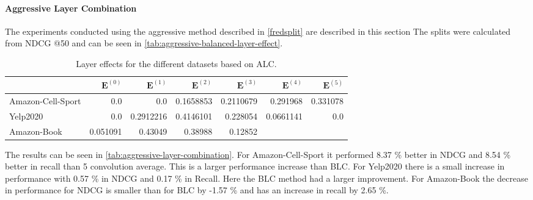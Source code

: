 \paragraph{Aggressive Layer Combination}
The experiments conducted using the aggressive method described in \autoref{fredsplit} are described in this section
The splits were calculated from NDCG @50 and can be seen in \autoref{tab:aggressive-balanced-layer-effect}.
\begin{table*}[]
    \centering
    \begin{tabular}{|l|r|r|r|r|r|r|}
        \hline
                          & $\mathbf{E}^{(0)}$ & $\mathbf{E}^{(1)}$ & $\mathbf{E}^{(2)}$ & $\mathbf{E}^{(3)}$ & $\mathbf{E}^{(4)}$ & $\mathbf{E}^{(5)}$ \\ \hline
        Amazon-Cell-Sport & 0.0                & 0.0                & 0.1658853          & 0.2110679          & 0.291968           & 0.331078           \\ \hline
        Yelp2020          & 0.0                & 0.2912216          & 0.4146101          & 0.228054           & 0.0661141          & 0.0                \\ \hline
        Amazon-Book       & 0.051091           & 0.43049            & 0.38988            & 0.12852            &                    &                    \\ \hline
    \end{tabular}
    \caption{Layer effects for the different datasets based on ALC.}
    \label{tab:aggressive-balanced-layer-effect}
\end{table*}
The results can be seen in \autoref{tab:aggressive-layer-combination}.
For Amazon-Cell-Sport it performed 8.37 \% better in NDCG and 8.54 \% better in recall than 5 convolution average.
This is a larger performance increase than BLC.
For Yelp2020 there is a small increase in performance with 0.57 \% in NDCG and 0.17 \% in Recall.
Here the BLC method had a larger improvement.
For Amazon-Book the decrease in performance for NDCG is smaller than for BLC by -1.57 \% and has an increase in recall by  2.65 \%.
